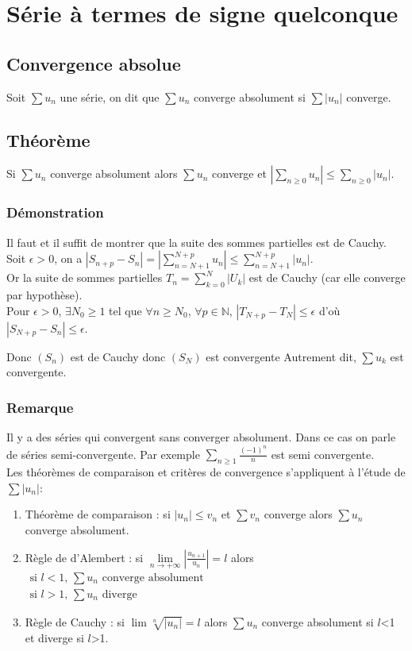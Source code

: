 \documentclass[a4paper,10pt]{book} %
\newcommand{\N}{\mathbb{N}}
\newcommand{\abs}[1]{\left|#1\right|}
\begin{document}
\section{Série à termes de signe quelconque}
\subsection{Convergence absolue}
Soit $\sum u_n$ une série, on dit que $\sum u_n$ converge absolument si $\sum \abs{u_n}$ converge.

\subsection{Théorème}
Si $\sum u_n$ converge absolument alors $\sum u_n$ converge et $\abs{\sum_{n\geq 0} u_n}\leq \sum_{n\geq 0} \abs{u_n}$.

\subsubsection{Démonstration}
Il faut et il suffit de montrer que la suite des sommes partielles est de Cauchy.\\
Soit $\epsilon>0$, on a $\abs{S_{n+p}-S_n}=\abs{\sum_{n=N+1}^{N+p} u_n}\leq \sum_{n=N+1}^{N+p} \abs{u_n}$.\\
Or la suite de sommes partielles $T_n=\sum_{k=0}^{N} \abs{U_k}$ est de Cauchy (car elle converge par hypothèse).\smallskip\\
Pour $\epsilon>0$, $\exists N_0\geq 1$ tel que $\forall n\geq N_0$, $\forall p\in\N$, $\abs{T_{N+p}-T_N}\leq \epsilon$ d'où $\abs{S_{N+p}-S_n}\leq\epsilon$.

Donc $(S_n)$ est de Cauchy donc $(S_N)$ est convergente
Autrement dit, $\sum u_k$ est convergente.

\subsubsection{Remarque}
Il y a des séries qui convergent sans converger absolument. Dans ce cas on parle de séries semi-convergente.
Par exemple $\sum_{n\geq 1} \frac{(-1)^n}{n}$ est semi convergente.\\

Les théorèmes de comparaison et critères de convergence s'appliquent à l'étude de $\sum\abs{u_n}$:

\begin{enumerate}
\item Théorème de comparaison :
si $\abs{u_n}\leq v_n$ et $\sum v_n$ converge alors $\sum u_n$ converge absolument.

\item Règle de d'Alembert : si $\lim\limits_{n\rightarrow+\infty} \abs{\frac{u_{n+1}}{u_n}} =l$ alors $\begin{array}{l}\text{si }l<1\text{, }\sum u_n\text{ converge absolument}\\
\text{si }l>1\text{, }\sum u_n\text{ diverge}\end{array}$

\item Règle de Cauchy : si $\lim \sqrt[n]{\abs{u_n}}=l$ alors $\sum u_n$ converge absolument si $l$<1 et diverge si $l$>1.
\end{enumerate}
\end{document}
